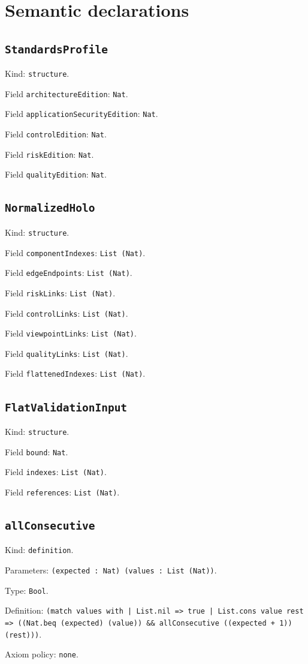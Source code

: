 \documentclass[11pt]{article}
\begin{document}
\section*{Semantic declarations}
\subsection*{\texttt{StandardsProfile}}
\noindent Kind: \texttt{structure}.\par
\noindent Field \texttt{architectureEdition}: \texttt{Nat}.\par
\noindent Field \texttt{applicationSecurityEdition}: \texttt{Nat}.\par
\noindent Field \texttt{controlEdition}: \texttt{Nat}.\par
\noindent Field \texttt{riskEdition}: \texttt{Nat}.\par
\noindent Field \texttt{qualityEdition}: \texttt{Nat}.\par
\subsection*{\texttt{NormalizedHolo}}
\noindent Kind: \texttt{structure}.\par
\noindent Field \texttt{componentIndexes}: \texttt{List (Nat)}.\par
\noindent Field \texttt{edgeEndpoints}: \texttt{List (Nat)}.\par
\noindent Field \texttt{riskLinks}: \texttt{List (Nat)}.\par
\noindent Field \texttt{controlLinks}: \texttt{List (Nat)}.\par
\noindent Field \texttt{viewpointLinks}: \texttt{List (Nat)}.\par
\noindent Field \texttt{qualityLinks}: \texttt{List (Nat)}.\par
\noindent Field \texttt{flattenedIndexes}: \texttt{List (Nat)}.\par
\subsection*{\texttt{FlatValidationInput}}
\noindent Kind: \texttt{structure}.\par
\noindent Field \texttt{bound}: \texttt{Nat}.\par
\noindent Field \texttt{indexes}: \texttt{List (Nat)}.\par
\noindent Field \texttt{references}: \texttt{List (Nat)}.\par
\subsection*{\texttt{allConsecutive}}
\noindent Kind: \texttt{definition}.\par
\noindent Parameters: \texttt{(expected : Nat) (values : List (Nat))}.\par
\noindent Type: \texttt{Bool}.\par
\noindent Definition: \texttt{(match values with | List.nil => true | List.cons value rest => ((Nat.beq (expected) (value)) \&\& allConsecutive ((expected + 1)) (rest)))}.\par
\noindent Axiom policy: \texttt{none}.\par
\end{document}
